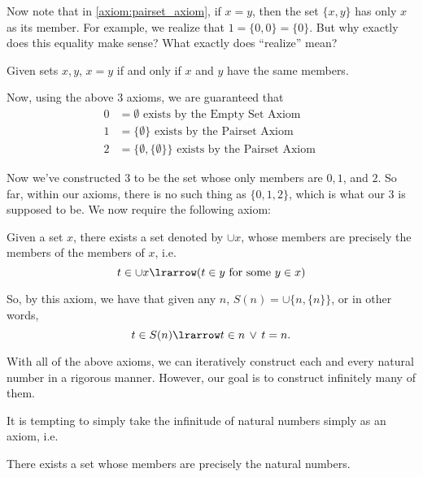 \documentclass[notoc,notitlepage]{tufte-book}
\begin{document}
Now note that in \cref{axiom:pairset_axiom}, if $x = y$, then the set $\{x, y\}$ has only $x$ as its member. For example, we realize that $1 = \{ 0, 0 \} = \{ 0 \}$. But why exactly does this equality make sense? What exactly does ``realize'' mean?

\begin{axiom}
\label{axiom:axiom_of_extension}
  Given sets $x, y$, $x = y$ if and only if $x$ and $y$ have the same members.
\end{axiom}

Now, using the above 3 axioms, we are guaranteed that
\begin{align*}
  0 &= \emptyset \text{ exists by the Empty Set Axiom } \\
  1 &= \{ \emptyset \} \text{ exists by the Pairset Axiom } \\
  2 &= \{ \emptyset, \{ \emptyset \} \} \text{ exists by the Pairset Axiom }
\end{align*}

Now we've constructed $3$ to be the set whose only members are $0, 1$, and $2$. So far, within our axioms, there is no such thing as $\{0, 1, 2\}$, which is what our $3$ is supposed to be. We now require the following axiom:

\begin{axiom}
\label{axiom:union_set_axiom}
  Given a set $x$, there exists a set denoted by $\cup x$, whose members are precisely the members of the members of $x$, i.e.
  \begin{equation*}
    t \in \cup x \lrarrow ( t \in y \text{ for some } y \in x )
  \end{equation*}
\end{axiom}

So, by this axiom, we have that given any $n$, $S(n) = \cup \{ n, \{ n \} \}$, or in other words,
\begin{equation*}
  t \in S(n) \lrarrow t \in n \, \lor \, t = n.
\end{equation*}

With all of the above axioms, we can iteratively construct each and every natural number in a rigorous manner. However, our goal is to construct infinitely many of them.

It is tempting to simply take the infinitude of natural numbers simply as an axiom, i.e.

\begin{magentaquote}\label{sp:natural_numbers_axiom}
  There exists a set whose members are precisely the natural numbers.
\end{magentaquote}
\end{document}
